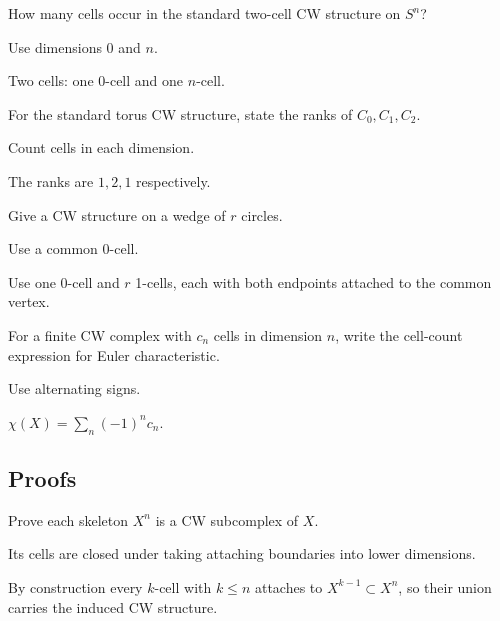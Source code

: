 \begin{exercise}\label{exr:viii06-ped-02}
How many cells occur in the standard two-cell CW structure on $S^n$?
\end{exercise}
\begin{hint}
Use dimensions $0$ and $n$.
\end{hint}
\begin{solution}
Two cells: one 0-cell and one $n$-cell.
\end{solution}

\begin{exercise}\label{exr:viii06-ped-03}
For the standard torus CW structure, state the ranks of $C_0,C_1,C_2$.
\end{exercise}
\begin{hint}
Count cells in each dimension.
\end{hint}
\begin{solution}
The ranks are $1,2,1$ respectively.
\end{solution}

\begin{exercise}\label{exr:viii06-ped-04}
Give a CW structure on a wedge of $r$ circles.
\end{exercise}
\begin{hint}
Use a common 0-cell.
\end{hint}
\begin{solution}
Use one 0-cell and $r$ 1-cells, each with both endpoints attached to the common vertex.
\end{solution}

\begin{exercise}\label{exr:viii06-ped-05}
For a finite CW complex with $c_n$ cells in dimension $n$, write the cell-count expression for Euler characteristic.
\end{exercise}
\begin{hint}
Use alternating signs.
\end{hint}
\begin{solution}
$\chi(X)=\sum_n(-1)^n c_n$.
\end{solution}

\subsection*{Proofs}

\begin{exercise}\label{exr:viii06-ped-06}
Prove each skeleton $X^n$ is a CW subcomplex of $X$.
\end{exercise}
\begin{hint}
Its cells are closed under taking attaching boundaries into lower dimensions.
\end{hint}
\begin{solution}
By construction every $k$-cell with $k\le n$ attaches to $X^{k-1}\subset X^n$, so their union carries the induced CW structure.
\end{solution}

